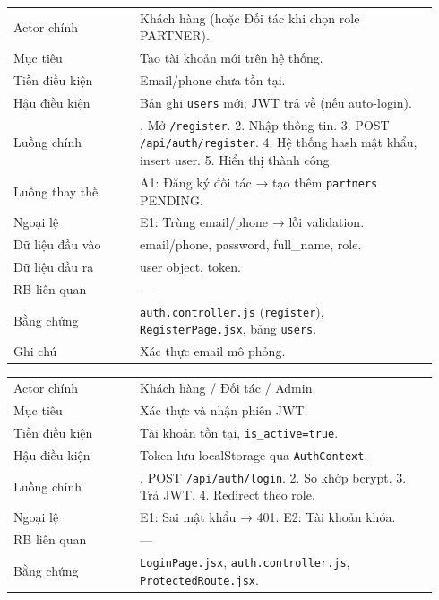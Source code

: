 \begin{longtable}{>{\raggedright\arraybackslash}p{0.28\linewidth}>{\raggedright\arraybackslash}p{0.66\linewidth}}
Actor chính & Khách hàng (hoặc Đối tác khi chọn role PARTNER).\\
Mục tiêu & Tạo tài khoản mới trên hệ thống.\\
Tiền điều kiện & Email/phone chưa tồn tại.\\
Hậu điều kiện & Bản ghi \texttt{users} mới; JWT trả về (nếu auto-login).\\
Luồng chính & 1. Mở \texttt{/register}. 2. Nhập thông tin. 3. POST \texttt{/api/auth/register}. 4. Hệ thống hash mật khẩu, insert user. 5. Hiển thị thành công.\\
Luồng thay thế & A1: Đăng ký đối tác → tạo thêm \texttt{partners} PENDING.\\
Ngoại lệ & E1: Trùng email/phone → lỗi validation.\\
Dữ liệu đầu vào & email/phone, password, full\_name, role.\\
Dữ liệu đầu ra & user object, token.\\
RB liên quan & —\\
Bằng chứng & \texttt{auth.controller.js} (\texttt{register}), \texttt{RegisterPage.jsx}, bảng \texttt{users}.\\
Ghi chú & Xác thực email mô phỏng.\\
\end{longtable}

\begin{longtable}{>{\raggedright\arraybackslash}p{0.28\linewidth}>{\raggedright\arraybackslash}p{0.66\linewidth}}
Actor chính & Khách hàng / Đối tác / Admin.\\
Mục tiêu & Xác thực và nhận phiên JWT.\\
Tiền điều kiện & Tài khoản tồn tại, \texttt{is\_active=true}.\\
Hậu điều kiện & Token lưu localStorage qua \texttt{AuthContext}.\\
Luồng chính & 1. POST \texttt{/api/auth/login}. 2. So khớp bcrypt. 3. Trả JWT. 4. Redirect theo role.\\
Ngoại lệ & E1: Sai mật khẩu → 401. E2: Tài khoản khóa.\\
RB liên quan & —\\
Bằng chứng & \texttt{LoginPage.jsx}, \texttt{auth.controller.js}, \texttt{ProtectedRoute.jsx}.\\
\end{longtable}

